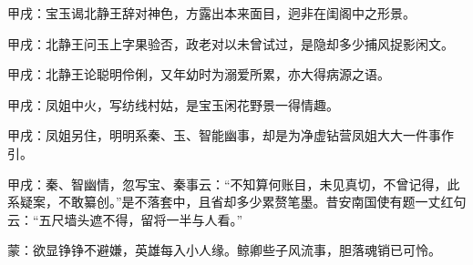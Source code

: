 \begin{parag}
    \begin{note}甲戌：宝玉谒北静王辞对神色，方露出本来面目，迥非在闺阁中之形景。\end{note}
\end{parag}


\begin{parag}
    \begin{note}甲戌：北静王问玉上字果验否，政老对以未曾试过，是隐却多少捕风捉影闲文。\end{note}
\end{parag}


\begin{parag}
    \begin{note}甲戌：北静王论聪明伶俐，又年幼时为溺爱所累，亦大得病源之语。\end{note}
\end{parag}


\begin{parag}
    \begin{note}甲戌：凤姐中火，写纺线村姑，是宝玉闲花野景一得情趣。\end{note}
\end{parag}


\begin{parag}
    \begin{note}甲戌：凤姐另住，明明系秦、玉、智能幽事，却是为净虚钻营凤姐大大一件事作引。\end{note}
\end{parag}


\begin{parag}
    \begin{note}甲戌：秦、智幽情，忽写宝、秦事云：“不知算何账目，未见真切，不曾记得，此系疑案，不敢纂创。”是不落套中，且省却多少累赘笔墨。昔安南国使有题一丈红句云：“五尺墙头遮不得，留将一半与人看。”\end{note}
\end{parag}


\begin{parag}
    \begin{note}蒙：欲显铮铮不避嫌，英雄每入小人缘。鲸卿些子风流事，胆落魂销已可怜。\end{note}
\end{parag}


